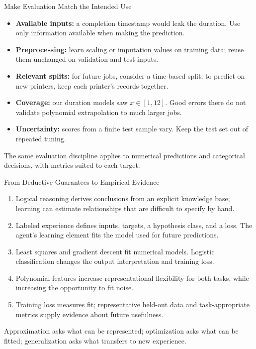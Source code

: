 \documentclass[aspectratio=169,10pt]{beamer}
\begin{document}
\begin{frame}{Make Evaluation Match the Intended Use}
  \small
  \begin{itemize}
    \item \textbf{Available inputs:} a completion timestamp would leak the duration. Use only information available when making the prediction.
    \item \textbf{Preprocessing:} learn scaling or imputation values on training data; reuse them unchanged on validation and test inputs.
    \item \textbf{Relevant splits:} for future jobs, consider a time-based split; to predict on new printers, keep each printer's records together.
    \item \textbf{Coverage:} our duration models saw $x\in[1,12]$. Good errors there do not validate polynomial extrapolation to much larger jobs.
    \item \textbf{Uncertainty:} scores from a finite test sample vary. Keep the test set out of repeated tuning.
  \end{itemize}
  \begin{keyidea}
    The same evaluation discipline applies to numerical predictions and categorical decisions, with metrics suited to each target.
  \end{keyidea}
\end{frame}

\begin{frame}{From Deductive Guarantees to Empirical Evidence}
  \small
  \begin{enumerate}
    \item Logical reasoning derives conclusions from an explicit knowledge base; learning can estimate relationships that are difficult to specify by hand.
    \item Labeled experience defines inputs, targets, a hypothesis class, and a loss. The agent's learning element fits the model used for future predictions.
    \item Least squares and gradient descent fit numerical models. Logistic classification changes the output interpretation and training loss.
    \item Polynomial features increase representational flexibility for both tasks, while increasing the opportunity to fit noise.
    \item Training loss measures fit; representative held-out data and task-appropriate metrics supply evidence about future usefulness.
  \end{enumerate}
  \begin{keyidea}
    Approximation asks what can be represented; optimization asks what can be fitted; generalization asks what transfers to new experience.
  \end{keyidea}
\end{frame}
\end{document}
